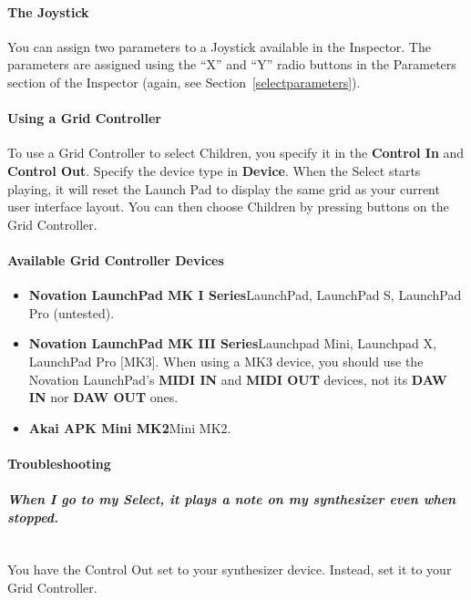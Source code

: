 \documentclass[twoside,10pt]{article}
\begin{document}
\paragraph{The Joystick}
You can assign two parameters to a Joystick available in the Inspector.  The parameters are assigned using the ``X'' and ``Y'' radio buttons in the Parameters section of the Inspector (again, see Section~\ref{selectparameters}).

\paragraph{Using a Grid Controller}

To use a Grid Controller to select Children, you specify it in the {\bf Control In} and {\bf Control Out}.  Specify the device type in {\bf Device}.  When the Select starts playing, it will reset the Launch Pad to display the same grid as your current user interface layout.  You can then choose Children by pressing buttons on the Grid Controller.

\paragraph{Available Grid Controller Devices}

\begin{itemize}
\item {\bf Novation LaunchPad MK I Series}\qquad LaunchPad, LaunchPad S, LaunchPad Pro (untested).   
\item {\bf Novation LaunchPad MK III Series}\qquad Launchpad Mini, Launchpad X, LaunchPad Pro [MK3].  When using a MK3 device, you should use the Novation LaunchPad's {\bf MIDI IN} and {\bf MIDI OUT} devices, not its {\bf DAW IN} nor {\bf DAW OUT} ones.  
\item {\bf Akai APK Mini MK2}\qquad Mini MK2.   

\end{itemize}

\paragraph{Troubleshooting}

\paragraph{\it When I go to my Select, it plays a note on my synthesizer even when stopped.}~\\
\noindent You have the Control Out set to your synthesizer device.  Instead, set it to your Grid Controller.
\end{document}
